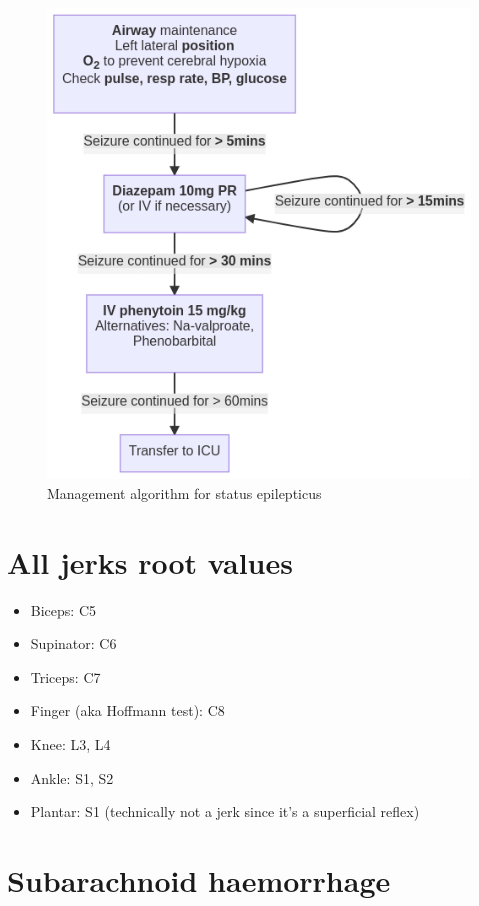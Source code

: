 \documentclass[
  12pt,
]{memoir}
\providecommand{\tightlist}{%
  \setlength{\itemsep}{0pt}\setlength{\parskip}{0pt}}
\begin{document}
\begin{figure}
    \centering
    \includegraphics[width=.7\textwidth]{../assets/med/stat-epi.png}
    \vspace{7mm}
    \caption{Management algorithm for status epilepticus}
\end{figure}

\hypertarget{all-jerks-root-values}{%
\section{All jerks root values}\label{all-jerks-root-values}}

\begin{itemize}
\tightlist
\item
  Biceps: C5
\item
  Supinator: C6
\item
  Triceps: C7
\item
  Finger (aka Hoffmann test): C8
\item
  Knee: L3, L4
\item
  Ankle: S1, S2
\item
  Plantar: S1 (technically not a jerk since it's a superficial reflex)
\end{itemize}

\pagebreak

\hypertarget{subarachnoid-haemorrhage}{%
\section{Subarachnoid haemorrhage}\label{subarachnoid-haemorrhage}}
\end{document}
